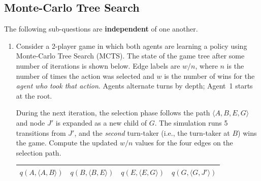 \subsection{\points[10] Monte-Carlo Tree Search}
The following sub-questions are \textbf{independent} of one another.
\begin{enumerate}
\item \points[5]
Consider a 2-player game in which both agents are learning a policy using
Monte-Carlo Tree Search (MCTS). The state of the game tree after some number of
iterations is shown below. Edge labels are $w/n$, where $n$ is the number of times
the action was selected and $w$ is the number of wins for the \emph{agent who took
that action}. Agents alternate turns by depth; Agent~1 starts at the root.
\begin{figure}[H]
\centering
{}
\end{figure}
\noindent
During the next iteration, the selection phase follows the path
$\langle A, B, E, G \rangle$ and node $J'$ is expanded as a new child of $G$.
The simulation runs 5 transitions from $J'$, and the
\emph{second} turn-taker (i.e., the turn-taker at $B$) wins the game.
\medskip\noindent
Compute the updated $w/n$ values for the four edges on the selection path.
\begin{table}[H]
\centering
\renewcommand{\arraystretch}{2.2}
\begin{tabular}{|c|c|c|c|}
\hline
$q(A,\langle A,B\rangle)$ & $q(B,\langle B,E\rangle)$ & $q(E,\langle E,G\rangle)$ & $q(G,\langle G,J'\rangle)$ \\\hline

\end{tabular}
\end{table}
\end{enumerate}
